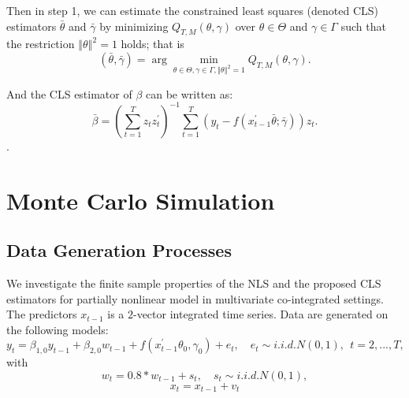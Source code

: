 \documentclass[a4paper,12pt,times,numbered,print,index]{report}
\numberwithin{equation}{section}
\begin{document}
Then in step 1, we can estimate the constrained least squares (denoted CLS) estimators $\bar{\theta}$ and $%
\bar{\gamma}$ by minimizing $Q_{T,M}\left( \theta ,\gamma \right) 
$ over $\theta \in \Theta $ and $\gamma \in \Gamma $ such that the
restriction $\left\Vert \theta \right\Vert ^{2}=1$ holds; that is%
\begin{equation*}
\left( \bar{\theta},\bar{\gamma}\right) =\arg \min_{\theta \in \Theta
	,\gamma \in \Gamma ,\left\Vert \theta \right\Vert ^{2}=1}Q_{T,M}\left(
\theta ,\gamma \right) .  \label{cls_c3}
\end{equation*}%

And the CLS estimator of $\beta$ can be written as:
$$
\bar{\beta} = \left( \sum_{t=1}^{T}z_t z_t^{\prime}\right)^{-1}\sum_{t=1}^{T}\left( y_t- f\left( x_{t-1}^{\prime }\bar{\theta}; \bar{\gamma}\right)\right) z_t.
$$.


\section{Monte Carlo Simulation}

\subsection{Data Generation Processes}
	
	We investigate the finite sample properties of the NLS and the proposed CLS estimators for partially nonlinear model in multivariate co-integrated settings. The predictors $x_{t-1}$ is a $2$-vector integrated time series. Data are generated on the following models:
	$$
	y_{t} = \beta_{1,0} y_{t-1} + \beta_{2,0} w_{t-1} + f\left( x_{t-1}^{\prime }\theta _{0},\gamma _{0}\right) +e_{t}, \quad
	e_{t}\sim i.i.d.N\left( 0,1\right) ,\ \ t=2,...,T,
	$$
	with
	$$
	w_{t} = 0.8*w_{t-1} + s_t, \quad
	s_{t}\sim i.i.d.N\left( 0,1\right),
	$$
	\begin{equation}
		x_t = x_{t-1} + v_t
		\label{xt}
	\end{equation}

	
	
	
	
\end{document}
